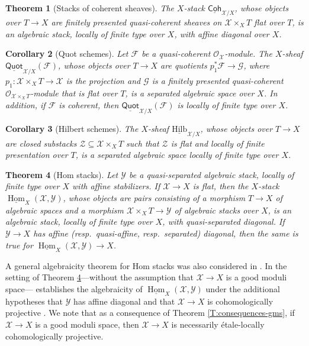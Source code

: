\documentclass[a4paper]{amsart}
\theoremstyle{plain}
\newtheorem{theorem}{Theorem}[section]
\newtheorem{corollary}[theorem]{Corollary}
\theoremstyle{definition}
\theoremstyle{remark}
\numberwithin{equation}{section}
\newcommand\cF{\mathcal{F}}
\newcommand\cG{\mathcal{G}}
\newcommand\cX{\mathcal{X}}
\newcommand\cY{\mathcal{Y}}
\newcommand\cZ{\mathcal{Z}}
\newcommand\oh{\mathcal{O}}
\newcommand\co{\colon}
\newcommand\Coh{\mathsf{Coh}}
\newcommand\Quot{\mathsf{Quot}}
\DeclareMathOperator{\Hom}{Hom}
\begin{document}
\begin{theorem}[Stacks of coherent sheaves]\label{T:coh}
  The $X$-stack $\underline{\Coh}_{\cX/X}$, whose objects over $T \to X$ are finitely presented quasi-coherent sheaves on $\cX \times_X T$ flat over $T$, is an algebraic stack, locally of finite type over $X$, with affine diagonal over $X$. 
\end{theorem}

\begin{corollary}[Quot schemes]\label{C:quot}
Let $\cF$ be a quasi-coherent $\oh_{\cX}$-module. The $X$-sheaf $\underline{\Quot}_{\cX/X}(\cF)$, whose objects over $T \to X$ are quotients $p_1^* \cF \to \cG$, where $p_1 \co \cX \times_X T \to \cX$ is the projection and $\cG$ is a finitely presented quasi-coherent $\oh_{\cX \times_X T}$-module that is flat over $T$, is a separated algebraic space over $X$. In addition, if $\cF$ is coherent, then $\underline{\Quot}_{\cX/X}(\cF)$ is locally of finite type over $X$.
\end{corollary}
\begin{corollary}[Hilbert schemes]\label{C:hilb}
 The $X$-sheaf $\underline{\mathrm{Hilb}}_{\cX/X}$, whose objects over $T \to X$ are closed substacks $\cZ \subseteq \cX \times_X T$ such that $\cZ$ is flat and locally of finite presentation over $T$, is a separated algebraic space locally of finite type over $X$.
\end{corollary}

\begin{theorem}[Hom stacks] \label{T:hom}
Let $\cY$ be a quasi-separated algebraic stack, locally of finite type over $X$ with affine stabilizers.
If $\cX \to X$ is flat, then the $X$-stack $\underline{\Hom}_X(\cX, \cY)$, whose objects are pairs consisting of a morphism $T \to X$ of algebraic spaces and a morphism $\cX \times_X T \to \cY$ of algebraic stacks over $X$, is an algebraic stack, locally of finite type over $X$, with quasi-separated diagonal.  If $\cY \to X$ has affine (resp.\ quasi-affine, resp.\ separated) diagonal, then the same is true for $\underline{\Hom}_X(\cX, \cY) \to X$.
\end{theorem}
A general algebraicity theorem for Hom stacks was also considered in \cite{hlp}.  In the setting of Theorem \ref{T:hom}---without the assumption that $\cX \to X$ is a good moduli space---\cite[Thm.~1.6]{hlp} establishes the algebraicity of $\underline{\Hom}_X(\cX, \cY)$ under the additional hypotheses that $\cY$ has affine diagonal and that $\cX \to X$ is cohomologically projective \cite[Def.~1.12]{hlp}.  We note that as a consequence of Theorem \ref{T:consequences-gms}, if $\cX \to X$ is a good moduli space, then $\cX \to X$ is necessarily \'etale-locally cohomologically projective.
\end{document}
